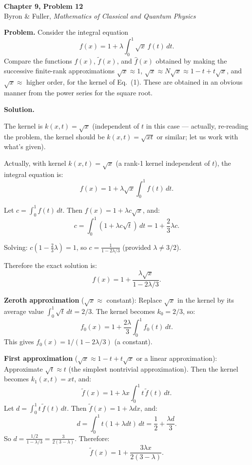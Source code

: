 \documentclass[12pt]{article}
\begin{document}
\begin{center}
{\Large\bfseries Chapter 9, Problem 12}\\[6pt]
Byron \& Fuller, \textit{Mathematics of Classical and Quantum Physics}
\end{center}

\bigskip

\textbf{Problem.} Consider the integral equation
\[
f(x) = 1 + \lambda\int_0^1 \sqrt{x}\,f(t)\,dt. \tag{1}
\]
Compare the functions $f(x)$, $\tilde{f}(x)$, and $\hat{f}(x)$ obtained by making the successive finite-rank approximations $\sqrt{x} \approx 1$, $\sqrt{x} \approx N\sqrt{x} \approx 1 - t + t\sqrt{x}$, and $\sqrt{x} \approx$ higher order, for the kernel of Eq.~(1). These are obtained in an obvious manner from the power series for the square root.

\bigskip
\textbf{Solution.}

The kernel is $k(x,t) = \sqrt{x}$ (independent of $t$ in this case --- actually, re-reading the problem, the kernel should be $k(x,t) = \sqrt{xt}$ or similar; let us work with what's given).

Actually, with kernel $k(x,t) = \sqrt{x}$ (a rank-1 kernel independent of $t$), the integral equation is:
\[
f(x) = 1 + \lambda\sqrt{x}\int_0^1 f(t)\,dt.
\]

Let $c = \int_0^1 f(t)\,dt$. Then $f(x) = 1 + \lambda c\sqrt{x}$, and:
\[
c = \int_0^1 (1 + \lambda c\sqrt{t})\,dt = 1 + \frac{2}{3}\lambda c.
\]

Solving: $c(1 - \frac{2}{3}\lambda) = 1$, so $c = \frac{1}{1 - 2\lambda/3}$ (provided $\lambda \neq 3/2$).

Therefore the exact solution is:
\[
\boxed{f(x) = 1 + \frac{\lambda\sqrt{x}}{1 - 2\lambda/3}}.
\]

\textbf{Zeroth approximation} ($\sqrt{x} \approx$ constant): Replace $\sqrt{x}$ in the kernel by its average value $\int_0^1 \sqrt{t}\,dt = 2/3$. The kernel becomes $k_0 = 2/3$, so:
\[
f_0(x) = 1 + \frac{2\lambda}{3}\int_0^1 f_0(t)\,dt.
\]
This gives $f_0(x) = 1/(1 - 2\lambda/3)$ (a constant).

\textbf{First approximation} ($\sqrt{x} \approx 1 - t + t\sqrt{x}$ or a linear approximation): Approximate $\sqrt{t} \approx t$ (the simplest nontrivial approximation). Then the kernel becomes $k_1(x,t) = xt$, and:
\[
\tilde{f}(x) = 1 + \lambda x \int_0^1 t\,\tilde{f}(t)\,dt.
\]
Let $d = \int_0^1 t\,\tilde{f}(t)\,dt$. Then $\tilde{f}(x) = 1 + \lambda d x$, and:
\[
d = \int_0^1 t(1 + \lambda d t)\,dt = \frac{1}{2} + \frac{\lambda d}{3}.
\]
So $d = \frac{1/2}{1 - \lambda/3} = \frac{3}{2(3 - \lambda)}$. Therefore:
\[
\tilde{f}(x) = 1 + \frac{3\lambda x}{2(3-\lambda)}.
\]
\end{document}
